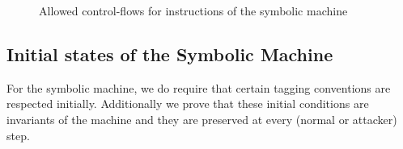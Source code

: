 \begin{figure}[htbp!]
\small
{}
\bigskip

\bigskip

\bigskip

\bigskip

\caption{Allowed control-flows for instructions of the symbolic machine}
\label{fig:symbolic_succ}
\end{figure}

\subsection{Initial states of the Symbolic Machine}
\label{sec:symbolic_initial}

For the symbolic machine, we do require that certain tagging
conventions are respected initially. Additionally we prove that
these initial conditions are invariants of the machine and they
are preserved at every (normal or attacker) step.

